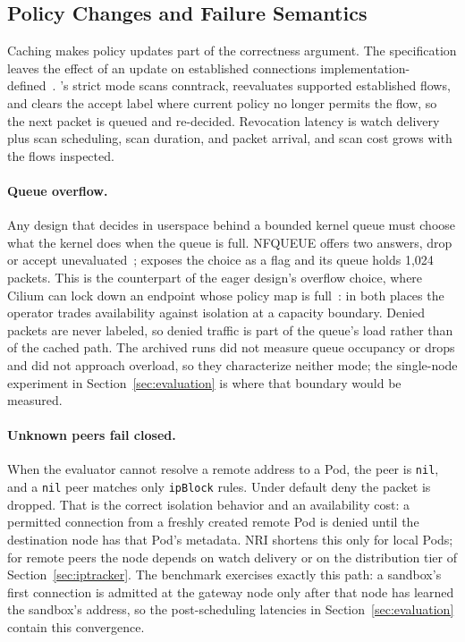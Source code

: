 \subsection{Policy Changes and Failure Semantics}
Caching makes policy updates part of the correctness argument. The
specification leaves the effect of an update on established connections
implementation-defined~\cite{k8snetworkpolicy}. \sys{}'s strict mode
scans conntrack, reevaluates supported established flows, and clears the
accept label where current policy no longer permits the flow, so the next
packet is queued and re-decided. Revocation latency is watch delivery
plus scan scheduling, scan duration, and packet arrival, and scan cost
grows with the flows inspected.

\paragraph{Queue overflow.}
Any design that decides in userspace behind a bounded kernel queue must
choose what the kernel does when the queue is full. NFQUEUE offers two
answers, drop or accept unevaluated~\cite{nfqueueapi}; \sys{} exposes
the choice as a flag and its queue holds 1,024 packets. This is the
counterpart of the eager design's overflow choice, where Cilium can lock
down an endpoint whose policy map is full~\cite{ciliumagentref}: in both
places the operator trades availability against isolation at a capacity
boundary. Denied packets are never labeled, so denied traffic is part of
the queue's load rather than of the cached path. The archived runs did
not measure queue occupancy or drops and did not approach overload, so
they characterize neither mode; the single-node experiment in
Section~\ref{sec:evaluation} is where that boundary would be measured.

\paragraph{Unknown peers fail closed.}
When the evaluator cannot resolve a remote address to a Pod, the peer is
\texttt{nil}, and a \texttt{nil} peer matches only \texttt{ipBlock}
rules. Under default deny the packet is dropped. That is the correct
isolation behavior and an availability cost: a permitted connection from
a freshly created remote Pod is denied until the destination node has
that Pod's metadata. NRI shortens this only for local Pods; for remote
peers the node depends on watch delivery or on the distribution tier of
Section~\ref{sec:iptracker}. The benchmark exercises exactly this path: a
sandbox's first connection is admitted at the gateway node only after
that node has learned the sandbox's address, so the post-scheduling
latencies in Section~\ref{sec:evaluation} contain this convergence.

